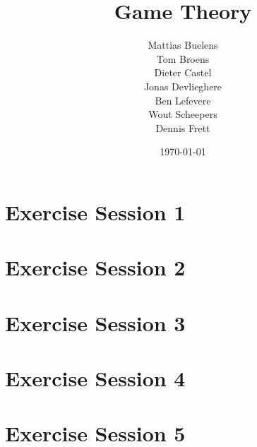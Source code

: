 \documentclass[a4paper, 11pt, oneside]{article}
\title{Game Theory}
\date{\today}
\author{Mattias Buelens \\ Tom Broens \\ Dieter Castel \\ Jonas Devlieghere \\ Ben Lefevere \\ Wout Scheepers \\ Dennis Frett}
\numberwithin{question}{section}
\theoremstyle{definition}
\numberwithin{solution}{section}
\begin{document}
\maketitle
\newpage

\tableofcontents
\newpage

\section{Exercise Session 1}


\section{Exercise Session 2}


\section{Exercise Session 3}


\section{Exercise Session 4}


\section{Exercise Session 5}


\nocite{*}
\printbibliography
\end{document}
